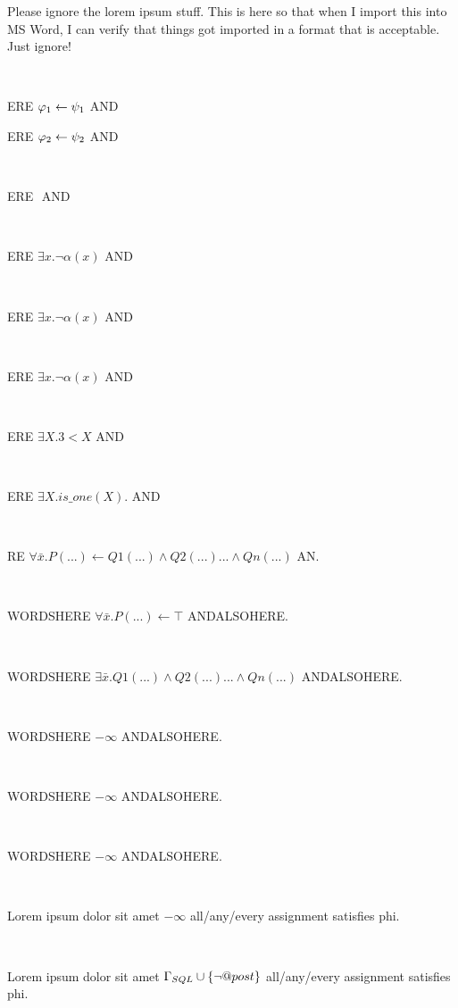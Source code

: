 \documentclass[12pt]{article}
\begin{document}
Please ignore the lorem ipsum stuff. This is here so that when I import this into MS Word, I can verify that things got imported in a format that is acceptable.  Just ignore!

\centerline{~}

ERE $ \varphi_{\scriptsize 1} \leftarrow \psi_{\scriptsize 1}   $ AND

ERE $ \varphi_{\scriptsize 2} \leftarrow \psi_{\scriptsize 2}   $ AND

\centerline{~}

ERE $    $ AND

\centerline{~}

ERE $ \exists x. \neg \alpha(x)   $ AND

\centerline{~}

ERE $ \exists x. \neg \alpha(x)   $ AND


\centerline{~}

ERE $ \exists x. \neg \alpha(x)   $ AND

\centerline{~}

ERE $ \exists X. 3 < X  $ AND

\centerline{~}

ERE $ \exists X. is\_one(X).  $ AND

\centerline{~}

RE $ \forall \bar{x}. P(...) \leftarrow Q1(...) \wedge Q2(...) ... \wedge Qn(...) $ AN.

\centerline{~}

WORDSHERE $ \forall \bar{x}. P(...) \leftarrow \top  $ ANDALSOHERE.

\centerline{~}

WORDSHERE $ \exists \bar{x}.  Q1(...) \wedge Q2(...) ... \wedge Qn(...)  $ ANDALSOHERE.

\centerline{~}

WORDSHERE $ - \infty $ ANDALSOHERE.

\centerline{~}

WORDSHERE $ - \infty $ ANDALSOHERE.

\centerline{~}

WORDSHERE $ - \infty $ ANDALSOHERE.



\centerline{~}

Lorem ipsum dolor sit amet $ - \infty $ all/any/every assignment satisfies phi.

\centerline{~}

Lorem ipsum dolor sit amet $ \Gamma_{\scriptsize SQL} \cup \{\neg @post\} $ all/any/every assignment satisfies phi.
\end{document}
